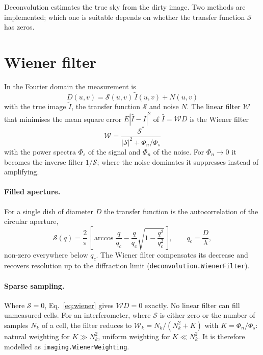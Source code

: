 
\label{ch:deconvolution}
Deconvolution estimates the true sky from the dirty image. Two
methods are implemented; which one is suitable depends on whether the
transfer function $\mathcal S$ has zeros.

\section{Wiener filter}

In the Fourier domain the measurement is
\begin{equation}
  D(u,v) = \mathcal S(u,v)\,\tilde I(u,v) + N(u,v)
\end{equation}
with the true image $\tilde I$, the transfer function $\mathcal S$ and
noise $N$. The linear filter $\mathcal W$ that minimises the mean square
error $E|\hat I - I|^2$ of $\hat I = \mathcal W D$ is the Wiener filter
\cite{wiener1949}
\begin{equation}
  \mathcal W = \frac{\mathcal S^*}{|\mathcal S|^2 + \Phi_n/\Phi_s}
  \label{eq:wiener}
\end{equation}
with the power spectra $\Phi_s$ of the signal and $\Phi_n$ of the
noise. For $\Phi_n\to0$ it becomes the inverse filter $1/\mathcal S$;
where the noise dominates it suppresses instead of amplifying.

\paragraph*{Filled aperture.} For a single dish of diameter $D$ the
transfer function is the autocorrelation of the circular aperture,
\begin{equation}
  \mathcal S(q) = \frac{2}{\pi}\left[\arccos\frac{q}{q_c}
     - \frac{q}{q_c}\sqrt{1-\frac{q^2}{q_c^2}}\right],
  \qquad q_c = \frac{D}{\lambda},
\end{equation}
non-zero everywhere below $q_c$. The Wiener filter compensates its
decrease and recovers resolution up to the diffraction limit
(\texttt{deconvolution.WienerFilter}).

\paragraph*{Sparse sampling.} Where $\mathcal S = 0$, Eq.~\eqref{eq:wiener}
gives $\mathcal W D = 0$ exactly. No linear filter can fill unmeasured
cells. For an interferometer, where $\mathcal S$ is either zero or the
number of samples $N_k$ of a cell, the filter reduces to
$\mathcal W_k = N_k/(N_k^2+K)$ with $K=\Phi_n/\Phi_s$: natural
weighting for $K\gg N_k^2$, uniform weighting for $K\ll N_k^2$. It is
therefore modelled as \texttt{imaging.WienerWeighting}.

